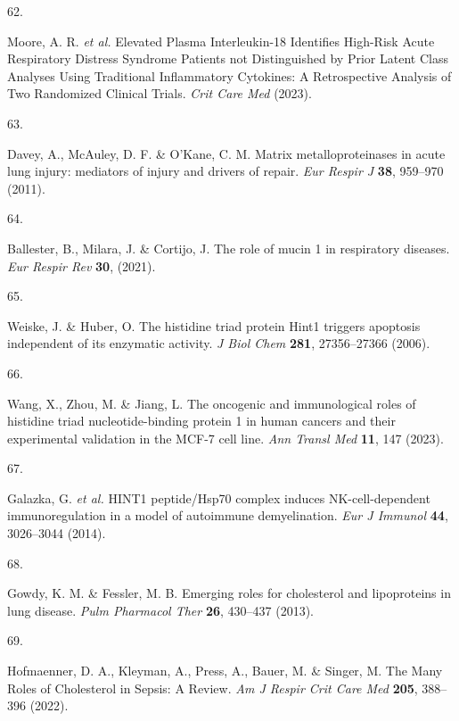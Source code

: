 \documentclass[
  11,
  a4paper,
]{article}
\newlength{\cslhangindent}
\newlength{\csllabelwidth}
\newenvironment{CSLReferences}[2] %
 {\begin{list}{}{%
  \setlength{\itemindent}{0pt}
  \setlength{\leftmargin}{0pt}
  \setlength{\parsep}{0pt}
  \ifodd #1
   \setlength{\leftmargin}{\cslhangindent}
   \setlength{\itemindent}{-1\cslhangindent}
  \fi
  \setlength{\itemsep}{#2\baselineskip}}}
 {\end{list}}
\newcommand{\CSLLeftMargin}[1]{\parbox[t]{\csllabelwidth}{\strut#1\strut}}
\newcommand{\CSLRightInline}[1]{\parbox[t]{\linewidth - \csllabelwidth}{\strut#1\strut}}
\begin{document}
\begin{CSLReferences}{0}{0}
\CSLLeftMargin{62. }%
\CSLRightInline{Moore, A. R. \emph{et al.} {{E}levated {P}lasma
{I}nterleukin-18 {I}dentifies {H}igh-{R}isk {A}cute {R}espiratory
{D}istress {S}yndrome {P}atients not {D}istinguished by {P}rior {L}atent
{C}lass {A}nalyses {U}sing {T}raditional {I}nflammatory {C}ytokines: {A}
{R}etrospective {A}nalysis of {T}wo {R}andomized {C}linical {T}rials}.
\emph{Crit Care Med} (2023).}

\CSLLeftMargin{63. }%
\CSLRightInline{Davey, A., McAuley, D. F. \& O'Kane, C. M. {{M}atrix
metalloproteinases in acute lung injury: mediators of injury and drivers
of repair}. \emph{Eur Respir J} \textbf{38}, 959--970 (2011).}

\CSLLeftMargin{64. }%
\CSLRightInline{Ballester, B., Milara, J. \& Cortijo, J. {{T}he role of
mucin 1 in respiratory diseases}. \emph{Eur Respir Rev} \textbf{30},
(2021).}

\CSLLeftMargin{65. }%
\CSLRightInline{Weiske, J. \& Huber, O. {{T}he histidine triad protein
{H}int1 triggers apoptosis independent of its enzymatic activity}.
\emph{J Biol Chem} \textbf{281}, 27356--27366 (2006).}

\CSLLeftMargin{66. }%
\CSLRightInline{Wang, X., Zhou, M. \& Jiang, L. {{T}he oncogenic and
immunological roles of histidine triad nucleotide-binding protein 1 in
human cancers and their experimental validation in the {M}{C}{F}-7 cell
line}. \emph{Ann Transl Med} \textbf{11}, 147 (2023).}

\CSLLeftMargin{67. }%
\CSLRightInline{Galazka, G. \emph{et al.} {{H}{I}{N}{T}1 peptide/{H}sp70
complex induces {N}{K}-cell-dependent immunoregulation in a model of
autoimmune demyelination}. \emph{Eur J Immunol} \textbf{44}, 3026--3044
(2014).}

\CSLLeftMargin{68. }%
\CSLRightInline{Gowdy, K. M. \& Fessler, M. B. {{E}merging roles for
cholesterol and lipoproteins in lung disease}. \emph{Pulm Pharmacol
Ther} \textbf{26}, 430--437 (2013).}

\CSLLeftMargin{69. }%
\CSLRightInline{Hofmaenner, D. A., Kleyman, A., Press, A., Bauer, M. \&
Singer, M. {{T}he {M}any {R}oles of {C}holesterol in {S}epsis: {A}
{R}eview}. \emph{Am J Respir Crit Care Med} \textbf{205}, 388--396
(2022).}


\end{CSLReferences}
\end{document}
